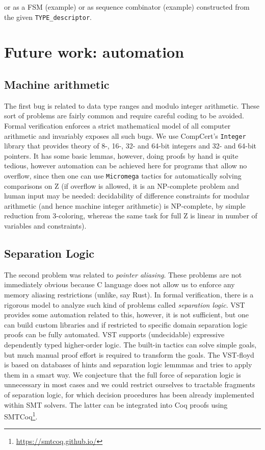 \documentclass[acmsmall,nonacm]{acmart}
\begin{document}
 or as a FSM (example) or as sequence combinator (example) constructed from the given \texttt{TYPE\_descriptor}.


\section{Future work: automation}


\subsection{Machine arithmetic}

The first bug is related to data type ranges and modulo integer
arithmetic. These sort of problems are fairly common and require
careful coding to be avoided. Formal verification enforces a strict
mathematical model of all computer arithmetic and invariably exposes
all such bugs. We use CompCert's \texttt{Integer} library that
provides theory of 8-, 16-, 32- and 64-bit integers and 32- and 64-bit
pointers. It has some basic lemmas, however, doing proofs by hand is
quite tedious, however automation can be achieved here for programs
that allow no overflow, since then one can use
\texttt{Micromega}
tactics for automatically solving comparisons on Z (if overflow is
allowed, it is an NP-complete problem and human input may be needed:
decidability of difference constraints for modular arithmetic (and
hence machine integer arithmetic) is NP-complete, by simple reduction
from 3-coloring\cite{PointerConstraintsNP}, whereas the same task for
full Z is linear in number of variables and constraints).


\subsection{Separation Logic}

The second problem was related to \textit{pointer aliasing}. These problems are not immediately obvious because C language does not allow us to enforce any memory aliasing restrictions (unlike, say Rust). In formal verification, there is a rigorous model to analyze such kind of problems called \textit{separation logic}. VST provides some automation related to this, however, it is not sufficient, but one can build custom libraries and if restricted to specific domain separation logic proofs can be fully automated. VST supports (undecidable) expressive dependently typed higher-order logic. The built-in tactics can solve simple goals, but much manual proof effort is required to transform the goals. The VST-floyd is based on databases of hints and separation logic lemmmas and tries to apply them in a smart way. We conjecture that the full force of separation logic is unnecessary in most cases and we could restrict ourselves to tractable fragments of separation logic, for which decision procedures has been already implemented within SMT solvers. The latter can be integrated into Coq proofs using SMTCoq\footnote{\url{https://smtcoq.github.io/}}.

 


\end{document}
